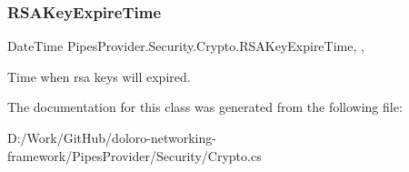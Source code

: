 \subsubsection{\texorpdfstring{R\+S\+A\+Key\+Expire\+Time}{RSAKeyExpireTime}}
{\footnotesize\ttfamily Date\+Time Pipes\+Provider.\+Security.\+Crypto.\+R\+S\+A\+Key\+Expire\+Time\hspace{0.3cm}{\ttfamily [static]}, {\ttfamily [get]}, {}}



Time when rsa keys will expired. 



The documentation for this class was generated from the following file\+:\begin{DoxyCompactItemize}
\item 
D\+:/\+Work/\+Git\+Hub/doloro-\/networking-\/framework/\+Pipes\+Provider/\+Security/Crypto.\+cs\end{DoxyCompactItemize}
